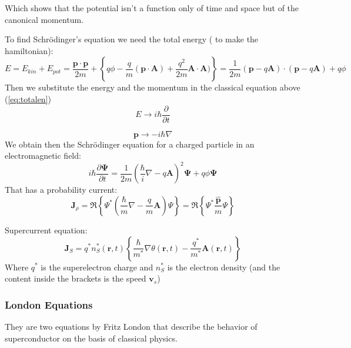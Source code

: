 \documentclass[12pt]{article}
\numberwithin{equation}{subsection}
\newcommand\page[1]{
{
}
}
\begin{document}
Which shows that the potential isn't a function only of time and space but of the canonical momentum.

\page{12}
To find Schrödinger's equation we need the total energy ( to make the hamiltonian):
\begin{equation}
    E= E_{kin}+ E_{pot}  = \frac{\mathbf p \cdot \mathbf p}{2m}+\left\{ q\phi- \frac{q}{m} (\mathbf{p} \cdot \mathbf{A}) + \frac{q^2}{2m} \mathbf A \cdot \mathbf A)\right\} = \frac{1}{2m} (\mathbf{p} -q \mathbf{A})\cdot(\mathbf{p} -q \mathbf{A})+q\phi
    \label{eq:totalen}
\end{equation}
Then we substitute the energy and the momentum in the classical equation above (\ref{eq:totalen})
\begin{equation}
    E \rightarrow i\hbar \frac{\partial}{\partial t}
\end{equation}
    
\begin{equation}
    \mathbf{p}\rightarrow -i\hbar \nabla
\end{equation}
We obtain then the Schrödinger equation for a charged particle in an electromagnetic field:
\begin{equation}
    i\hbar \frac{\partial\mathbf \Psi}{\partial t}= \frac{1}{2m}\left( \frac{\hbar}{i}\nabla -q\mathbf A \right)^2 \mathbf \Psi + q \phi  \mathbf \Psi 
\end{equation}
That has a probability current:
\begin{equation}
    \mathbf J_\rho =\mathfrak R \left \{ \Psi^* \left(\frac{\hbar}{m}\nabla-\frac{q}{m} \mathbf A\right)\Psi      \right\} = \mathfrak R \left \{ \Psi^* \frac{\hat{ \mathbf p}}{m} \Psi      \right\}
\end{equation}

Supercurrent equation:
\begin{equation}
    \mathbf J_S = q^* n_S^*(\mathbf r,t) \left \{ \frac{\hbar}{m^*} \nabla\theta(\mathbf r, t) -\frac{q^*}{m^*} \mathbf A (\mathbf r, t)  \right \}
    \label{eq:supcur}
\end{equation}
Where $q^*$ is the superelectron charge and $n^*_S $ is the electron density (and the content inside the brackets is the speed $\mathbf v_s$)
\page{18}
\subsubsection{London Equations}
They are two equations by Fritz London that describe the behavior of superconductor on the basis of classical physics.
\end{document}
